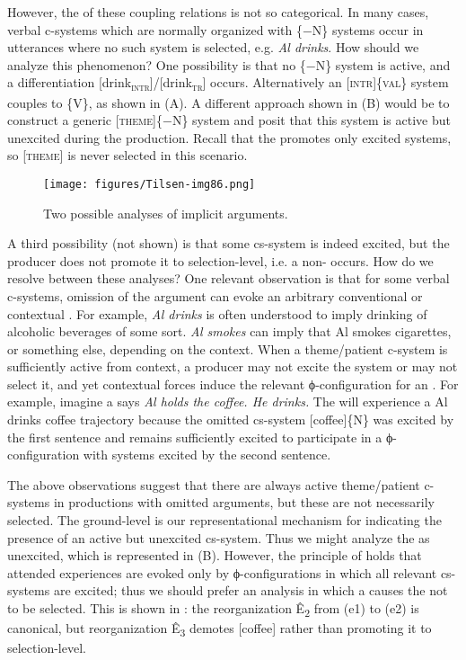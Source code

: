   However, the  of these coupling relations is not so categorical. In many cases, verbal c-systems which are normally organized with \{−N\} systems occur in utterances where no such system is selected, e.g. \textit{Al drinks}. How should we analyze this phenomenon? One possibility is that no \{−N\} system is active, and a differentiation [drink\textsc{\textsubscript{intr}}]/[drink\textsc{\textsubscript{tr}}] occurs. Alternatively an [\textsc{intr}]\{\textsc{val}\} system couples to \{V\}, as shown in {}(A). A different approach shown in (B) would be to construct a generic [\textsc{theme}]\{−N\} system and posit that this system is active but unexcited during the production. Recall that the  promotes only excited systems, so [\textsc{theme}] is never selected in this scenario. 

  
\begin{figure}
\texttt{[image: figures/Tilsen-img86.png]}
\caption{Two possible analyses of implicit arguments.}
\label{fig:4:36}
\end{figure}
 

  A third possibility (not shown) is that some cs-system is indeed excited, but the producer does not promote it to selection-level, i.e. a non- occurs. How do we resolve between these analyses? One relevant observation is that for some verbal c-systems, omission of the argument can evoke an arbitrary conventional or contextual . For example, \textit{Al drinks} is often understood to imply drinking of alcoholic beverages of some sort. \textit{Al smokes} can imply that Al smokes cigarettes, or something else, depending on the context. When a theme/patient c-system is sufficiently active from context, a producer may not excite the system or may not select it, and yet contextual forces induce the relevant ϕ-con\-fig\-u\-ra\-tion for an . For example, imagine a  says \textit{Al holds the coffee. He drinks.} The  will experience a {\textbar}Al drinks coffee{\textbar} trajectory because the omitted cs-system [coffee]\{N\} was excited by the first sentence and remains sufficiently excited to participate in a ϕ-con\-fig\-u\-ra\-tion with systems excited by the second sentence.

  The above observations suggest that there are always active theme/patient c-systems in productions with omitted arguments, but these are not necessarily selected. The ground-level is our representational mechanism for indicating the presence of an active but unexcited cs-system. Thus we might analyze the  as unexcited, which is represented in {}(B). However, the principle of  holds that attended  experiences are evoked only by ϕ-con\-fig\-u\-ra\-tions in which all relevant cs-systems are excited; thus we should prefer an analysis in which a  causes the  not to be selected. This is shown in {}: the reorganization Ê\textsubscript{2} from (e1) to (e2) is canonical, but reorganization Ê\textsubscript{3} demotes [coffee] rather than promoting it to selection-level.

